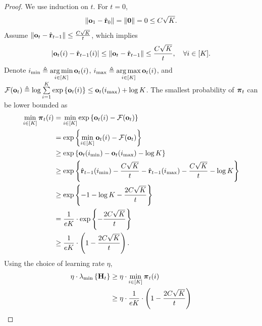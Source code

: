 \documentclass[10pt]{article}
\begin{document}
\begin{proof}
We use induction on $t$. For $t=0$,
\begin{equation*}
\begin{split}
    \left\| {\mathbf{o}}_{1} - \hat{{\mathbf{r}}}_0 \right\| = \left\| {\mathbf{0}} \right\| = 0 \le C \sqrt{K}.
\end{split}
\end{equation*}
Assume $\left\| {\mathbf{o}}_{t} - \hat{{\mathbf{r}}}_{t-1} \right\| \le \frac{C \sqrt{K}}{t}$, which implies
\begin{equation*}
\begin{split}
    \left| {\mathbf{o}}_{t}(i) - \hat{{\mathbf{r}}}_{t-1}(i) \right| \le \left\| {\mathbf{o}}_{t} - \hat{{\mathbf{r}}}_{t-1} \right\| \le \frac{C \sqrt{K}}{t}, \quad \forall i \in [K].
\end{split}
\end{equation*}
Denote $i_{\min} \triangleq \operatorname*{arg\,min}\limits_{i \in [K]}{{\mathbf{o}}_t(i)} $, $i_{\max} \triangleq \operatorname*{arg\,max}\limits_{i \in [K]}{{\mathbf{o}}_t(i)} $, and ${\mathcal{F}}({\mathbf{o}}_t) \triangleq \log{\sum\limits_{i = 1}^K{\exp\left\{ {\mathbf{o}}_t(i) \right\}} } \le {\mathbf{o}}_t(i_{\max}) + \log{K}$. The smallest probability of ${\boldsymbol{\pi}}_t$ can be lower bounded as
\begin{equation*}
\begin{split}
    \min\limits_{i \in [K]}{{\boldsymbol{\pi}}_t(i)} &= \min\limits_{i \in [K]}{ \exp\left\{ {\mathbf{o}}_t(i) - {\mathcal{F}}({\mathbf{o}}_t) \right\} } \\
    &= \exp\left\{ \min\limits_{i \in [K]}{{\mathbf{o}}_t(i)} - {\mathcal{F}}({\mathbf{o}}_t) \right\} \\
    &\ge \exp\left\{ {\mathbf{o}}_t(i_{\min}) - {\mathbf{o}}_t(i_{\max}) - \log{K} \right\} \\
    &\ge \exp\left\{ \hat{{\mathbf{r}}}_{t-1}(i_{\min}) - \frac{C \sqrt{K}}{t} - \hat{{\mathbf{r}}}_{t-1}(i_{\max}) - \frac{C \sqrt{K}}{t} - \log{K} \right\} \\
    &\ge \exp\left\{ -1 - \log{K} - \frac{2 C \sqrt{K}}{t} \right\} \\
    &= \frac{1}{e K} \cdot \exp\left\{ - \frac{2 C \sqrt{K}}{t} \right\} \\
    &\ge \frac{1}{e K} \cdot \left( 1 - \frac{2 C \sqrt{K}}{t} \right).
\end{split}
\end{equation*}
Using the choice of learning rate $\eta$,
\begin{equation*}
\begin{split}
    \eta \cdot \lambda_{\min}\left\{ \rmH_t \right\} &\ge \eta \cdot \min\limits_{i \in [K]}{\rvpi_t(i)} \\
    &\ge \eta \cdot \frac{1}{e K} \cdot \left( 1 - \frac{2 C \sqrt{K}}{t} \right) \\

\end{split}
\end{equation*}
\end{proof}
\end{document}
